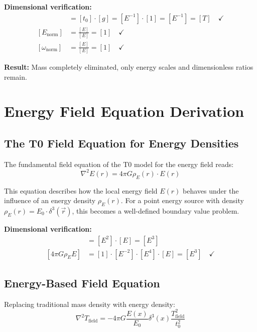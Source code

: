 \documentclass[12pt,a4paper]{report}
\newcommand{\tzero}{t_0}                  %
\begin{document}
\textbf{Dimensional verification:}
\begin{align}
	[T_{\text{field}}] &= [\tzero] \cdot [g] = [E^{-1}] \cdot [1] = [E^{-1}] = [T] \quad \checkmark \\
	[E_{\text{norm}}] &= \frac{[E]}{[E]} = [1] \quad \checkmark \\
	[\omega_{\text{norm}}] &= \frac{[E]}{[E]} = [1] \quad \checkmark
\end{align}

\textbf{Result:} Mass completely eliminated, only energy scales and dimensionless ratios remain.

\section{Energy Field Equation Derivation}
\label{sec:energy_field_equation}

\subsection{The T0 Field Equation for Energy Densities}
\label{subsec:field_equation_energy}

The fundamental field equation of the T0 model for the energy field reads:
\begin{equation}
	\nabla^2 E(r) = 4\pi G \rho_E(r) \cdot E(r)
	\label{eq:t0_field_equation_energy}
\end{equation}

This equation describes how the local energy field $E(r)$ behaves under the influence of an energy density $\rho_E(r)$. For a point energy source with density $\rho_E(r) = E_0 \cdot \delta^3(\vec{r})$, this becomes a well-defined boundary value problem.

\textbf{Dimensional verification:}
\begin{align}
	[\nabla^2 E] &= [E^2] \cdot [E] = [E^3] \\
	[4\pi G \rho_E E] &= [1] \cdot [E^{-2}] \cdot [E^4] \cdot [E] = [E^3] \quad \checkmark
\end{align}

\subsection{Energy-Based Field Equation}
\label{subsec:energy_field_equation_corrected}

Replacing traditional mass density with energy density:
\begin{equation}
	\boxed{\nabla^2 T_{\text{field}} = -4\pi G \frac{E(x)}{E_0} \delta^3(x) \frac{T_{\text{field}}^2}{\tzero^2}}
	\label{eq:field_equation_energy_based}
\end{equation}
\end{document}
